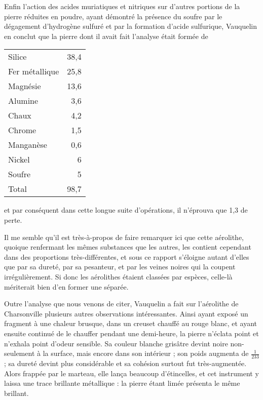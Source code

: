 \documentclass[a4paper, 12pt, oneside, french]{article}
\begin{document}
Enfin l'action des acides muriatiques et nitriques sur d'autres portions de la pierre réduites en poudre, ayant démontré la présence du soufre par le dégagement d'hydrogène sulfuré et par la formation d'acide sulfurique, Vauquelin en conclut que la pierre dont il avait fait l'analyse était formée de
\begin{table}[H]
    \centering
    \Fontauri
    \large
    \begin{tabular}{l r}
        Silice & 38,4 \\
        Fer métallique & 25,8 \\
        Magnésie & 13,6 \\
        Alumine & 3,6 \\
        Chaux & 4,2 \\
        Chrome & 1,5 \\
        Manganèse & 0,6 \\
        Nickel & 6 \\
        Soufre & 5 \\ \hline
        Total & 98,7 \\
    \end{tabular}
\end{table}
et par conséquent dans cette longue suite d'opérations, il n'éprouva que 1,3 de perte.

Il me semble qu'il est très-à-propos de faire remarquer ici que cette aérolithe, quoique renfermant les mêmes substances que les autres, les contient cependant dans des proportions très-différentes, et sous ce rapport s'éloigne autant d'elles que par sa dureté, par sa pesanteur, et par les veines noires qui la coupent irrégulièrement. Si donc les aérolithes étaient classées par espèces, celle-là mériterait bien d'en former une séparée.

Outre l'analyse que nous venons de citer, Vauquelin a fait sur l'aérolithe de Charsonville plusieurs autres observations intéressantes. Ainsi ayant exposé un fragment à une chaleur brusque, dans un creuset chauffé au rouge blanc, et ayant ensuite continué de le chauffer pendant une demi-heure, la pierre n'éclata point et n'exhala point d'odeur sensible. Sa couleur blanche grisâtre devint noire non-seulement à la surface, mais encore dans son intérieur ; son poids augmenta de $\frac{1}{233}$ ; sa dureté devint plus considérable et sa cohésion surtout fut très-augmentée. Alors frappée par le marteau, elle lança beaucoup d'étincelles, et cet instrument y laissa une trace brillante métallique : la pierre étant limée présenta le même brillant.
\end{document}

